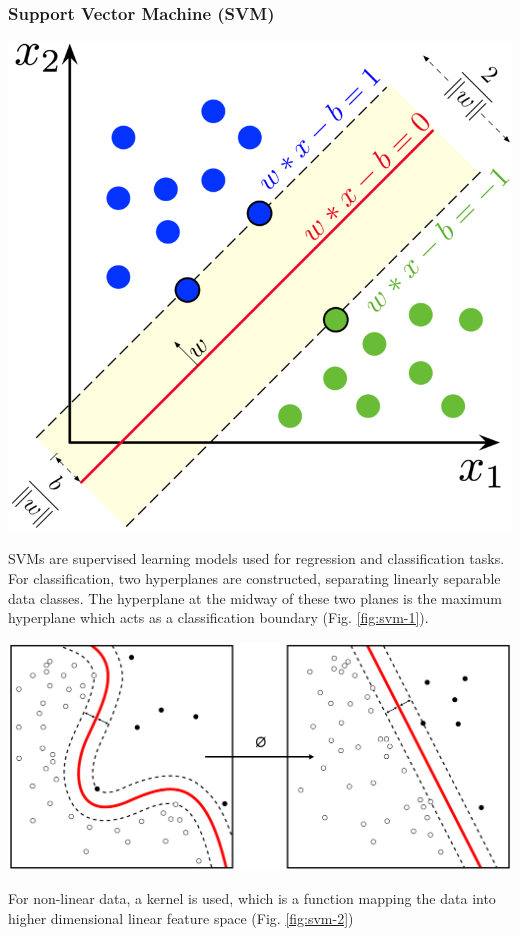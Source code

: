 \documentclass[a4paper, 12pt]{article}
\begin{document}
\subsubsection{Support Vector Machine (SVM)}
\begin{center}
\includegraphics[scale=1.8]{svm-1.png}
\label{fig:svm-1}
\end{center}

\noindent SVMs are supervised learning models used for regression and classification tasks. For classification, two hyperplanes are constructed, separating linearly separable data classes. The hyperplane at the midway of these two planes is the maximum hyperplane which acts as a classification boundary (Fig. \ref{fig:svm-1}).

\vskip 0.2in
\begin{center}
\includegraphics[scale=0.2]{svm-2.png}
\label{fig:svm-2}
\end{center}
\noindent 
For non-linear data, a kernel is used, which is a function mapping the data into higher dimensional linear feature space (Fig. \ref{fig:svm-2})
\end{document}
